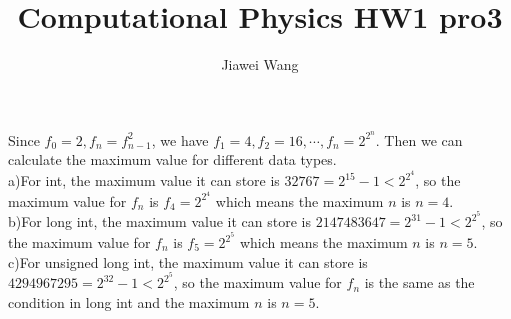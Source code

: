 \documentclass[a4paper,12pt]{article}
\begin{document}
\title{Computational Physics HW1 pro3}
\author{Jiawei Wang}
\date{}
\maketitle

\noindent Since $f_0=2, f_n=f_{n-1}^2$, we have $f_1=4, f_2=16, \cdots, f_n=2^{2^n}$. Then we can calculate the maximum value for different data types.\\
a)For int, the maximum value it can store is $32767=2^15-1<2^{2^4}$, so the maximum value for $f_n$ is $f_4=2^{2^4}$ which means the maximum $n$ is $n=4$.\\
b)For long int, the maximum value it can store is $2147483647=2^31-1<2^{2^5}$, so the maximum value for $f_n$ is $f_5=2^{2^5}$ which means the maximum $n$ is $n=5$.\\
c)For unsigned long int, the maximum value it can store is $4294967295=2^32-1<2^{2^5}$, so the maximum value for $f_n$ is the same as the condition in long int and the maximum $n$ is $n=5$.
\end{document}
